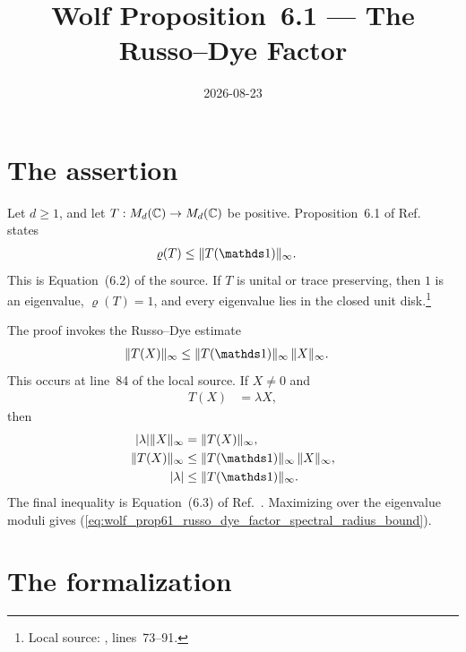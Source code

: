 \documentclass{article}
\title{Wolf Proposition~6.1 --- The Russo--Dye Factor}
\author{}
\date{2026-08-23}
\begin{document}
\maketitle
{}

\section{The assertion}

Let $d\geq1$, and let $T:M_{d}(\mathbb{C})\to M_{d}(\mathbb{C})$ be positive.
Proposition~6.1 of Ref.~\cite{Wolf2012Quantum} states
\begin{align}
    \varrho(T)
        &\leq\|T(\Id)\|_\infty.
    \label{eq:wolf_prop61_russo_dye_factor_spectral_radius_bound}
\end{align}
This is Equation~(6.2) of the source. If $T$ is unital or trace preserving,
then $1$ is an eigenvalue, $\varrho(T)=1$, and every eigenvalue lies in the
closed unit disk.\footnote{Local source:
, lines~73--91.}

The proof invokes the Russo--Dye estimate
\begin{align}
    \|T(X)\|_\infty
        &\leq\|T(\Id)\|_\infty\,\|X\|_\infty.
    \label{eq:wolf_prop61_russo_dye_factor_russo_dye_estimate}
\end{align}
This occurs at line~84 of the local source. If $X\neq0$ and
\begin{align}
    T(X)
        &=\lambda X,
    \label{eq:wolf_prop61_russo_dye_factor_eigenvector_equation}
\end{align}
then
\begin{align}
    |\lambda| \|X\|_\infty
        &=\|T(X)\|_\infty,
    \label{eq:wolf_prop61_russo_dye_factor_eigenvalue_norm_identity}\\
    \|T(X)\|_\infty
        &\leq\|T(\Id)\|_\infty\,\|X\|_\infty,
    \label{eq:wolf_prop61_russo_dye_factor_eigenvalue_norm_estimate}\\
    |\lambda|
        &\leq\|T(\Id)\|_\infty.
    \label{eq:wolf_prop61_russo_dye_factor_eigenvalue_bound}
\end{align}
The final inequality is Equation~(6.3) of
Ref.~\cite{Wolf2012Quantum}. Maximizing over the eigenvalue moduli gives
(\ref{eq:wolf_prop61_russo_dye_factor_spectral_radius_bound}).

\section{The formalization}
\end{document}
